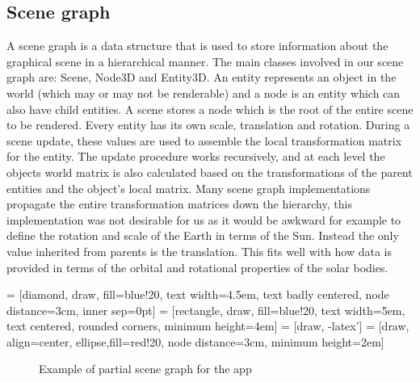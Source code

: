 \subsection{Scene graph}
\onehalfspacing
A scene graph is a data structure that is used to store information about the graphical scene in a hierarchical manner. 
The main classes involved in our scene graph are: Scene, Node3D and Entity3D. An entity represents an object in the world (which may or may not be renderable) and a node is an entity which can also have child entities. A scene stores a node which is the root of the entire scene to be rendered. Every entity has its own scale, translation and rotation. During a scene update, these values are used to assemble the local transformation matrix for the entity. The update procedure works recursively, and at each level the objects world matrix is also calculated based on the transformations of the parent entities and the object's local matrix.
Many scene graph implementations propagate the entire transformation matrices down the hierarchy, this implementation was not desirable for us as it would be awkward for example to define the rotation and scale of the Earth in terms of the Sun.
Instead the only value inherited from parents is the translation. This fits well with how data is provided in terms of the orbital and rotational properties of the solar bodies.

 = [diamond, draw, fill=blue!20, 
    text width=4.5em, text badly centered, node distance=3cm, inner sep=0pt]
 = [rectangle, draw, fill=blue!20, 
    text width=5em, text centered, rounded corners, minimum height=4em]
 = [draw, -latex']
 = [draw, align=center, ellipse,fill=red!20, node distance=3cm,
    minimum height=2em]
	
\singlespacing 
\begin{figure}[!htbp]
  \begin{center}
    \caption{Example of partial scene graph for the app}
    \label{FigSceneGraph}
  \end{center}
\end{figure}
\onehalfspacing
\pagebreak


